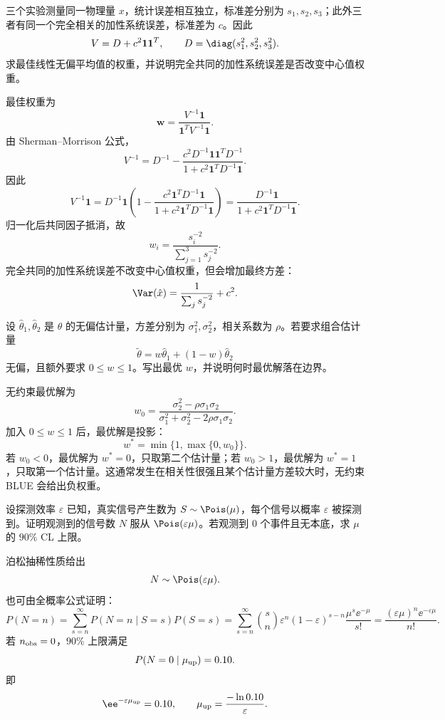 \begin{question}
三个实验测量同一物理量 $x$，统计误差相互独立，标准差分别为 $s_1,s_2,s_3$；此外三者有同一个完全相关的加性系统误差，标准差为 $c$。因此
\[
V=D+c^2\mathbf1\mathbf1^T,
\qquad
D=\diag(s_1^2,s_2^2,s_3^2).
\]
求最佳线性无偏平均值的权重，并说明完全共同的加性系统误差是否改变中心值权重。
\begin{solution}
最佳权重为
\[
\boldsymbol w=\frac{V^{-1}\mathbf1}{\mathbf1^TV^{-1}\mathbf1}.
\]
由 Sherman--Morrison 公式，
\[
V^{-1}=D^{-1}-\frac{c^2D^{-1}\mathbf1\mathbf1^TD^{-1}}{1+c^2\mathbf1^TD^{-1}\mathbf1}.
\]
因此
\[
V^{-1}\mathbf1
=D^{-1}\mathbf1\left(1-\frac{c^2\mathbf1^TD^{-1}\mathbf1}{1+c^2\mathbf1^TD^{-1}\mathbf1}\right)
=\frac{D^{-1}\mathbf1}{1+c^2\mathbf1^TD^{-1}\mathbf1}.
\]
归一化后共同因子抵消，故
\[
w_i=\frac{s_i^{-2}}{\sum_{j=1}^3s_j^{-2}}.
\]
完全共同的加性系统误差不改变中心值权重，但会增加最终方差：
\[
\Var(\hat x)=\frac1{\sum_js_j^{-2}}+c^2.
\]
\end{solution}
\end{question}

\begin{question}
设 $\hat\theta_1,\hat\theta_2$ 是 $\theta$ 的无偏估计量，方差分别为 $\sigma_1^2,\sigma_2^2$，相关系数为 $\rho$。若要求组合估计量
\[
\tilde\theta=w\hat\theta_1+(1-w)\hat\theta_2
\]
无偏，且额外要求 $0\le w\le1$。写出最优 $w$，并说明何时最优解落在边界。
\begin{solution}
无约束最优解为
\[
w_0=\frac{\sigma_2^2-\rho\sigma_1\sigma_2}
{\sigma_1^2+\sigma_2^2-2\rho\sigma_1\sigma_2}.
\]
加入 $0\le w\le1$ 后，最优解是投影：
\[
w^*=\min\{1,\max\{0,w_0\}\}.
\]
若 $w_0<0$，最优解为 $w^*=0$，只取第二个估计量；若 $w_0>1$，最优解为 $w^*=1$，只取第一个估计量。这通常发生在相关性很强且某个估计量方差较大时，无约束 BLUE 会给出负权重。
\end{solution}
\end{question}

\begin{question}
设探测效率 $\varepsilon$ 已知，真实信号产生数为 $S\sim\Pois(\mu)$，每个信号以概率 $\varepsilon$ 被探测到。证明观测到的信号数 $N$ 服从 $\Pois(\varepsilon\mu)$。若观测到 $0$ 个事件且无本底，求 $\mu$ 的 $90\%$ CL 上限。
\begin{solution}
泊松抽稀性质给出
\[
N\sim\Pois(\varepsilon\mu).
\]
也可由全概率公式证明：
\[
P(N=n)=\sum_{s=n}^{\infty}P(N=n\mid S=s)P(S=s)
=\sum_{s=n}^{\infty}\binom{s}{n}\varepsilon^n(1-\varepsilon)^{s-n}
\frac{\mu^s\ee^{-\mu}}{s!}
=\frac{(\varepsilon\mu)^n\ee^{-\varepsilon\mu}}{n!}.
\]
若 $n_{\rm obs}=0$，$90\%$ 上限满足
\[
P(N=0\mid\mu_{\rm up})=0.10.
\]
即
\[
\ee^{-\varepsilon\mu_{\rm up}}=0.10,
\qquad
\mu_{\rm up}=\frac{-\ln0.10}{\varepsilon}.
\]
\end{solution}
\end{question}

